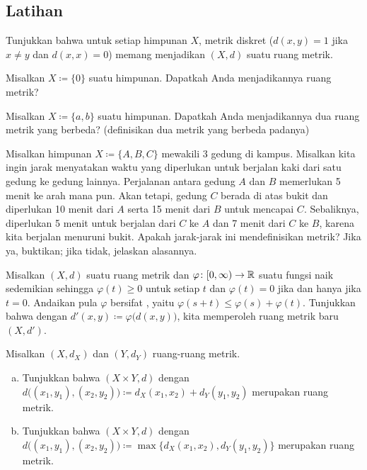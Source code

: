 \subsection{Latihan}

\begin{exercise}
Tunjukkan bahwa untuk setiap himpunan $X$, metrik diskret ($d(x,y) = 1$ jika $x \neq y$ dan
$d(x,x) = 0$) memang menjadikan $(X,d)$ suatu ruang metrik.
\end{exercise}

\begin{exercise}
Misalkan $X \coloneqq \{ 0 \}$ suatu himpunan.  Dapatkah Anda menjadikannya ruang metrik?
\end{exercise}

\begin{exercise}
Misalkan $X \coloneqq \{ a, b \}$ suatu himpunan.  Dapatkah Anda menjadikannya dua ruang
metrik yang berbeda?  (definisikan dua metrik yang berbeda padanya)
\end{exercise}

\begin{exercise}
Misalkan himpunan $X \coloneqq \{ A, B, C \}$ mewakili 3 gedung di kampus.  Misalkan kita
ingin jarak menyatakan waktu yang diperlukan untuk berjalan kaki dari satu gedung ke
gedung lainnya.
Perjalanan antara gedung $A$ dan $B$ memerlukan 5 menit ke arah mana pun.  Akan tetapi,
gedung $C$ berada di atas bukit dan diperlukan 10 menit dari $A$ serta 15 menit
dari $B$ untuk mencapai $C$.  Sebaliknya, diperlukan 5 menit untuk berjalan
dari $C$ ke $A$ dan 7 menit dari $C$ ke $B$, karena kita berjalan
menuruni bukit.  Apakah jarak-jarak ini mendefinisikan metrik?  Jika ya, buktikan; jika tidak, jelaskan
alasannya.
\end{exercise}

\begin{exercise}
Misalkan $(X,d)$ suatu ruang metrik dan
$\varphi \colon [0,\infty) \to {\mathbb{R}}$ suatu
fungsi naik sedemikian sehingga
$\varphi(t) \geq 0$ untuk setiap $t$ dan $\varphi(t) = 0$ jika dan hanya jika
$t=0$.  Andaikan pula $\varphi$ bersifat \emph{},
yaitu $\varphi(s+t) \leq \varphi(s)+\varphi(t)$.
Tunjukkan bahwa dengan $d'(x,y) \coloneqq \varphi\bigl(d(x,y)\bigr)$, kita memperoleh
ruang metrik baru $(X,d')$.
\end{exercise}

\begin{exercise} \label{exercise:mscross}
Misalkan $(X,d_X)$ dan $(Y,d_Y)$ ruang-ruang metrik.
\begin{enumerate}[a)]
\item
Tunjukkan bahwa $(X \times Y,d)$ dengan
$d\bigl( (x_1,y_1), (x_2,y_2) \bigr) \coloneqq d_X(x_1,x_2) + d_Y(y_1,y_2)$ merupakan
ruang metrik.
\item
Tunjukkan bahwa $(X \times Y,d)$ dengan
$d\bigl( (x_1,y_1), (x_2,y_2) \bigr) \coloneqq \max \bigl\{ d_X(x_1,x_2) ,
d_Y(y_1,y_2) \bigr\}$ merupakan
ruang metrik.
\end{enumerate}
\end{exercise}


